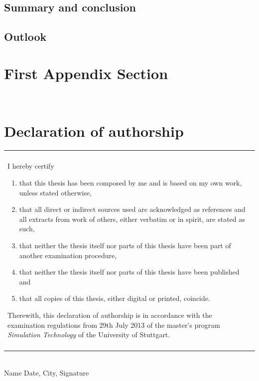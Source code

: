 \documentclass[twoside,a4paper]{article}
\begin{document}
\subsection{Summary and conclusion}

\subsection{Outlook}

%
%
\clearpage\newpage\null %
\newpage
\begin{appendices}
\section{First Appendix Section}

\newpage~\newpage
\section{Declaration of authorship}

\vspace{3cm}

\begin{table}[h!]
\centering
\begin{tabular}{|p{13cm}|}
\hline\\
	I hereby certify
	\begin{enumerate}
		\item that this thesis has been composed by me and is based on my own work, unless stated otherwise,
		\item that all direct or indirect sources used are acknowledged as references and all extracts from work of others, either verbatim or in spirit, are stated as such,
		\item that neither the thesis itself nor parts of this thesis have been part of another examination procedure,
		\item that neither the thesis itself nor parts of this thesis have been published and
		\item that all copies of this thesis, either digital or printed, coincide.
	\end{enumerate}
	Therewith, this declaration of authorship is in accordance with the examination regulations from 29th July 2013 of the master's program \emph{Simulation Technology} of the University of Stuttgart.\\\\
\hline
\end{tabular}
\end{table}

\vspace{4cm}
\hrulefill\\
Name
\hspace{7cm}
Date, City, Signature
\end{appendices}
\end{document}
